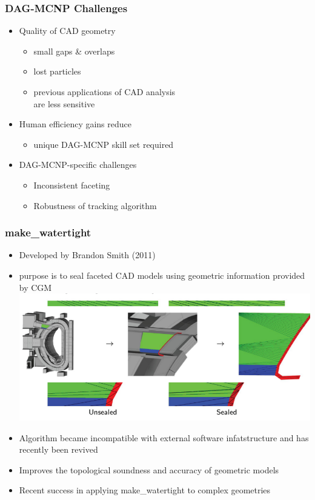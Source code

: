 \documentclass[14pt]{beamer}
\begin{document}
\begin{frame}
\frametitle{DAG-MCNP Challenges}
\begin{itemize}
\vfill

\item Quality of CAD geometry
	\begin{itemize}
	\color{red}
	\item small gaps \& overlaps
	\item lost particles
	\item previous applications of CAD analysis \\
	are less sensitive
	\end{itemize}
\vfill
\item Human efficiency gains reduce
	\begin{itemize}
	\item unique DAG-MCNP skill set required
	\end{itemize}
\vfill
\item DAG-MCNP-specific challenges
	\begin{itemize}
	\item Inconsistent faceting
	\item Robustness of tracking algorithm
	\end{itemize}
\end{itemize}
\end{frame}

\begin{frame}
\frametitle{make\_watertight}
\begin{itemize}
\item Developed by Brandon Smith (2011)
\item purpose is to seal faceted CAD models using geometric information provided by CGM
\vfill
\includegraphics[scale=0.4, trim = 80 0 0 0]{sealing_ex.png}
\end{itemize}
\end{frame}

\begin{frame}
\begin{itemize}
\frametitle{make\_watertight}
\item Algorithm became incompatible with external software infatstructure and has recently been revived
\item Improves the topological soundness and accuracy of geometric models
\item Recent success in applying make\_watertight to complex geometries
\end{itemize}
\end{frame}
\end{document}
